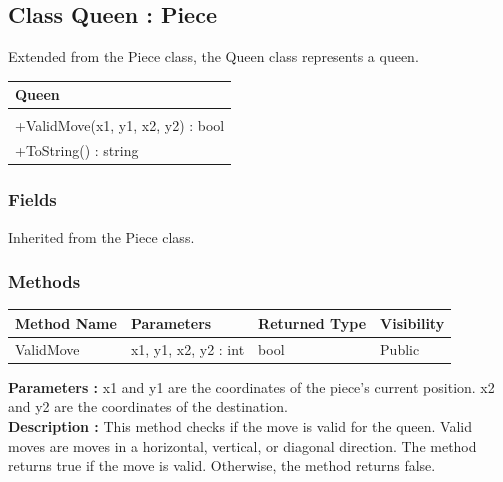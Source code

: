 \documentclass[12pt]{article}
\begin{document}
    \newpage


    \subsection{Class Queen : Piece}

    Extended from the Piece class, the Queen class represents a queen.
    \begin{table}[H]
        \begin{tabular}{|l|}
            \hline
            \cellcolor[HTML]{C0C0C0}\textbf{Queen} \\ \hline
            \cellcolor[HTML]{EFEFEF}               \\ \hline
            +ValidMove(x1, y1, x2, y2) : bool      \\ \hline
            +ToString() : string                   \\ \hline
        \end{tabular}
    \end{table}

    \subsubsection{Fields}

    Inherited from the Piece class.

    \subsubsection{Methods}

    \begin{table}[H]
        \begin{tabular}{|l|l|l|l|}
            \hline
            \rowcolor[HTML]{EFEFEF}
            \cellcolor[HTML]{EFEFEF}\textbf{Method Name} & \textbf{Parameters}  & \textbf{Returned Type} & \textbf{Visibility} \\ \hline
            ValidMove                                    & x1, y1, x2, y2 : int & bool                   & Public              \\ \hline
        \end{tabular}
    \end{table}

    \textbf{Parameters :} x1 and y1 are the coordinates of the piece's current position.
    x2 and y2 are the coordinates of the destination.
    \\
    \textbf{Description :} This method checks if the move is valid for the queen.
    Valid moves are moves in a horizontal, vertical, or diagonal direction.
    The method returns true if the move is valid.
    Otherwise, the method returns false.
\end{document}
